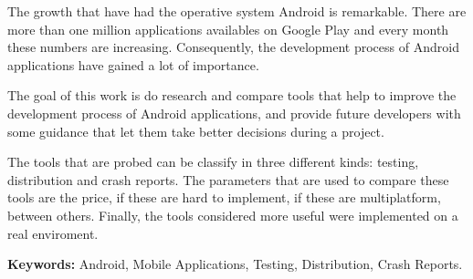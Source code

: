
The growth that have had the operative system Android is remarkable. There are more than one million applications availables on Google Play and every month these numbers are increasing. Consequently, the development process of Android applications have gained a lot of importance.

The goal of this work is do research and compare tools that help to improve the development process of Android applications, and provide future developers with some guidance that let them take better decisions during a project.

The tools that are probed can be classify in three different kinds: testing, distribution and crash reports. The parameters that are used to compare these tools are the price, if these are hard to implement, if these are multiplatform, between others. Finally, the tools considered more useful were implemented on a real enviroment.

\textbf{Keywords:} Android, Mobile Applications, Testing, Distribution, Crash Reports.
